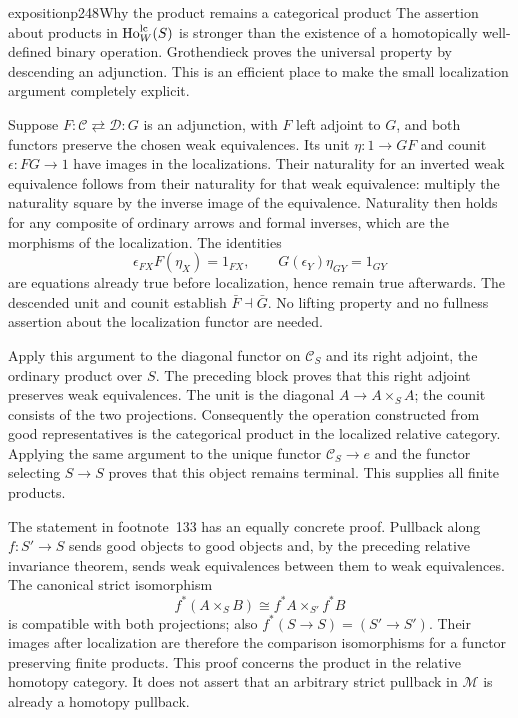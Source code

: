 \begin{dcomment}{exposition}{p248}{Why the product remains a categorical product}
The assertion about products in $\mathrm{Ho}_W^{\mathrm{lc}}(S)$ is stronger than the existence of a homotopically well-defined binary operation. Grothendieck proves the universal property by descending an adjunction. This is an efficient place to make the small localization argument completely explicit.

Suppose $F:\mathcal C\rightleftarrows\mathcal D:G$ is an adjunction, with $F$ left adjoint to $G$, and both functors preserve the chosen weak equivalences. Its unit $\eta:1\to GF$ and counit $\epsilon:FG\to1$ have images in the localizations. Their naturality for an inverted weak equivalence follows from their naturality for that weak equivalence: multiply the naturality square by the inverse image of the equivalence. Naturality then holds for any composite of ordinary arrows and formal inverses, which are the morphisms of the localization. The identities
\[
 \epsilon_{F X}F(\eta_X)=1_{F X},\qquad
 G(\epsilon_Y)\eta_{G Y}=1_{G Y}
\]
are equations already true before localization, hence remain true afterwards. The descended unit and counit establish $\bar F\dashv\bar G$. No lifting property and no fullness assertion about the localization functor are needed.

Apply this argument to the diagonal functor on $\mathcal C_S$ and its right adjoint, the ordinary product over $S$. The preceding block proves that this right adjoint preserves weak equivalences. The unit is the diagonal $A\to A\times_S A$; the counit consists of the two projections. Consequently the operation constructed from good representatives is the categorical product in the localized relative category. Applying the same argument to the unique functor $\mathcal C_S\to e$ and the functor selecting $S\to S$ proves that this object remains terminal. This supplies all finite products.

The statement in footnote~133 has an equally concrete proof. Pullback along $f:S'\to S$ sends good objects to good objects and, by the preceding relative invariance theorem, sends weak equivalences between them to weak equivalences. The canonical strict isomorphism
\[
 f^*(A\times_S B)\cong f^*A\times_{S'}f^*B
\]
is compatible with both projections; also $f^*(S\to S)=(S'\to S')$. Their images after localization are therefore the comparison isomorphisms for a functor preserving finite products. This proof concerns the product in the relative homotopy category. It does not assert that an arbitrary strict pullback in $\mathcal M$ is already a homotopy pullback.
\end{dcomment}



